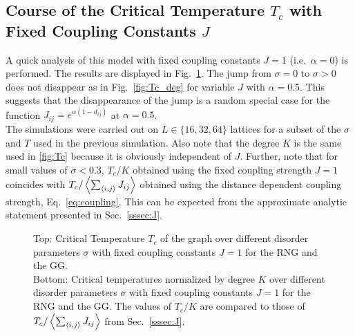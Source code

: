 \subsection{Course of the Critical Temperature $T_c$ with Fixed Coupling Constants $J$}
\label{appendix:fixedCoupling}
    A quick analysis of this model with fixed coupling constants \(J = 1\)
    (i.e.\ \(\alpha=0\)) is performed. The results are displayed in Fig.\ \ref{fig:Tc_deg_A0}.
    The jump from \(\sigma=0\) to \(\sigma>0\) does not disappear as in Fig.\ \ref{fig:Tc_deg}
    for variable \(J\) with \(\alpha=0.5\). This suggests that the
    disappearance of the jump is a random special case for the function
    \(J_{ij}=e^{\alpha(1-d_{ij})}\) at \(\alpha=0.5\).\\
    The simulations were carried out on \(L \in \{16,32,64\}\) lattices
    for a subset of the \(\sigma\) and \(T\) used in the previous simulation.
    Also note that the degree \(K\) is
    the same used in \ref{fig:Tc}
    because it is obviously independent of \(J\).
    Further, note that for small values of \(\sigma < 0.3\), \(T_c / K\)
    obtained using the fixed coupling strength \(J=1\) coincides with
    \(T_c / \left< \sum_{\left< i,j \right>}J_{ij} \right>\) obtained using the distance
    dependent coupling strength, Eq.\ \ref{eq:coupling}.
    This can be expected from the approximate analytic statement presented
    in Sec.\ \ref{sssec:J}.
    \begin{figure}[htbp]
        \centering


        \caption[Critical Temperature and Critical Temperature Normalized by Degree of the Graph for Fixed Coupling Constants $J=1$]
        {
            Top: Critical Temperature \(T_c\) of the graph over different
            disorder parameters \(\sigma\) with fixed coupling constants \(J=1\) for
             the RNG and
             the GG.\\
            Bottom: Critical temperatures normalized by degree \(K\) over
            different disorder parameters \(\sigma\) with fixed coupling constants \(J=1\) for
             the RNG and
             the GG. The values of \(T_c / K\)
            are compared to those of \(T_c /  \left< \sum_{\left< i,j \right>}J_{ij} \right>\)
            from Sec.\ \ref{sssec:J}.
        }
        \label{fig:Tc_deg_A0}
    \end{figure}\\
